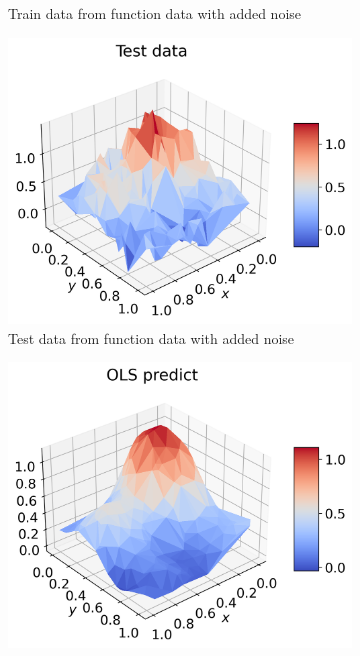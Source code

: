 \documentclass[12pt]{article}
\begin{document}
\begin{figure}[H]
\begin{subfigure}{.5\textwidth}
    \caption{Train data from function data with added noise}
    \label{fig:pred_train}
  \end{subfigure}
  \begin{subfigure}{.5\textwidth}
    \centering
    \includegraphics[width=\textwidth]{../figures/test_data_franke_2.png}
    \caption{Test data from function data with added noise}
    \label{fig:pred_test}
  \end{subfigure}
  \begin{subfigure}{.5\textwidth}
    \centering
    \includegraphics[width=\textwidth]{../figures/ols_pred_franke_2.png}

\end{subfigure}
\end{figure}
\end{document}

